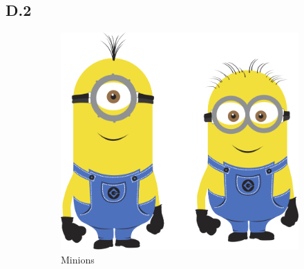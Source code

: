 \subsection{D.2} 

\begin{figure}[htb]
  \centering
  \begin{subfigure}[t]{0.49\linewidth}
    \includegraphics[width=\linewidth]{minion}
    \caption{Minions}
    \label{fig:minion}
  \end{subfigure}%
  \hfill
  \begin{subfigure}[t]{0.49\linewidth}

\end{subfigure}
\end{figure}
